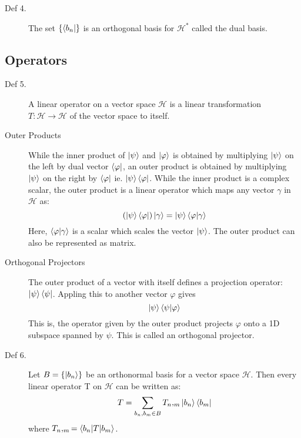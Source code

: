 \documentclass[12pt]{article}
\begin{document}
\begin{description}
    \item[Def 4.] The set \(\{\bra{b_n}\}\) is an orthogonal basis for \(\mathcal{H}^*\) called the dual basis. 
\end{description}

\subsection{Operators}

\begin{description}
    \item[Def 5.] A linear operator on a vector space \(\mathcal{H}\) is a linear transformation \(T : \mathcal{H} \to \mathcal{H}\) of the vector space to itself.
\end{description}

\begin{description}
    \item[Outer Products] While the inner product of \(\ket{\psi}\) and \(\ket{\varphi}\) is obtained by multiplying \(\ket{\psi}\) on the left by dual vector \(\bra{\varphi}\), an outer product is obtained by multiplying \(\ket{\psi}\) on the right by \(\bra{\varphi}\) ie. \(\ket{\psi}\bra{\varphi}\). While the inner product is a complex scalar, the outer product is a linear operator which maps any vector \(\gamma\) in \(\mathcal{H}\) as:
    \begin{equation}
        (\ket{\psi} \bra{\varphi}) \ket{\gamma} = \ket{\psi} \braket{\varphi | \gamma}
    \end{equation}
    Here, \(\braket{\varphi | \gamma}\) is a scalar which scales the vector \(\ket{\psi}\). The outer product can also be represented as matrix. 
\end{description}

\begin{description}
    \item[Orthogonal Projectors] The outer product of a vector with itself defines a projection operator: \( \ket{\psi} \bra{\psi}\). Appling this to another vector \(\varphi\) gives
    \begin{equation}
        \ket{\psi} \braket{\psi | \varphi}
    \end{equation}
    This is, the operator given by the outer product projects \(\varphi\) onto a 1D subspace spanned by \(\psi\). This is called an orthogonal projector.
\end{description}

\begin{description}
    \item[Def 6.] Let \(B = \{\ket{b_n}\}\) be an orthonormal basis for a vector space \(\mathcal{H}\). Then every linear operator T on \(\mathcal{H}\)  can be written as:
    \begin{equation}
        T = \sum_{b_n, b_m \in B} T_n,_m \ket{b_n} \bra{b_m}
    \end{equation}
    where \(T_n,_m = \braket{b_n|T|b_m}\).
\end{description}
\end{document}
